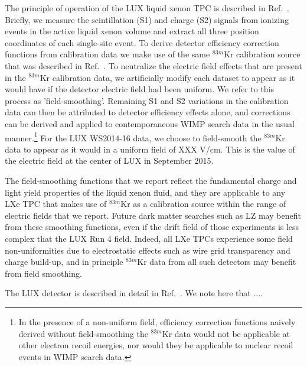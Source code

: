 The principle of operation of the LUX liquid xenon TPC is described in Ref.~\cite{lux-nim}. Briefly, 
we measure the scintillation (S1) and charge (S2) signals from ionizing events in the active 
liquid xenon
volume and extract all three position coordinates of each single-site event.
To derive detector efficiency correction functions from calibration data we make 
use of the same $^{83m}$Kr  calibration source that was described in Ref.~\cite{scottspaper}.
To neutralize the electric field effects that are present in the  $^{83m}$Kr calibration data, 
we artificially modify each dataset to appear as it would have if
the detector electric field had been uniform. We refer to this process as 'field-smoothing'. 
Remaining S1 and S2 variations in the calibration data can then be attributed to detector efficiency effects
alone, and corrections can be derived and applied to contemporaneous WIMP search data in the usual 
manner.\footnote{In the presence of a non-uniform field, efficiency correction 
functions naively derived without field-smoothing the $^{83m}$Kr data 
would not be applicable at other electron recoil energies, nor would they be applicable to nuclear
recoil events in WIMP search data.}
For the LUX WS2014-16 data, we choose to field-smooth the $^{83m}$Kr data to appear as it would in a 
uniform field of XXX V/cm. This is the value of the electric field at the center of
LUX in September 2015. 

The field-smoothing functions that we report reflect the fundamental charge and light
yield properties of the liquid xenon fluid, and they are applicable to any LXe TPC that makes
use of $^{83m}$Kr as a calibration source within the range of electric fields that we report.
Future dark matter searches such as LZ may benefit from these smoothing functions, 
even if the drift field of those experiments is less complex that the LUX Run 4 field. Indeed, 
all LXe TPCs experience some
field non-uniformities due to electrostatic effects such as wire grid transparency and charge
build-up, and in principle $^{83m}$Kr data from all such detectors may benefit from field smoothing.

The LUX detector is described in detail in Ref.~\cite{lux-nim}. We note here that ....





